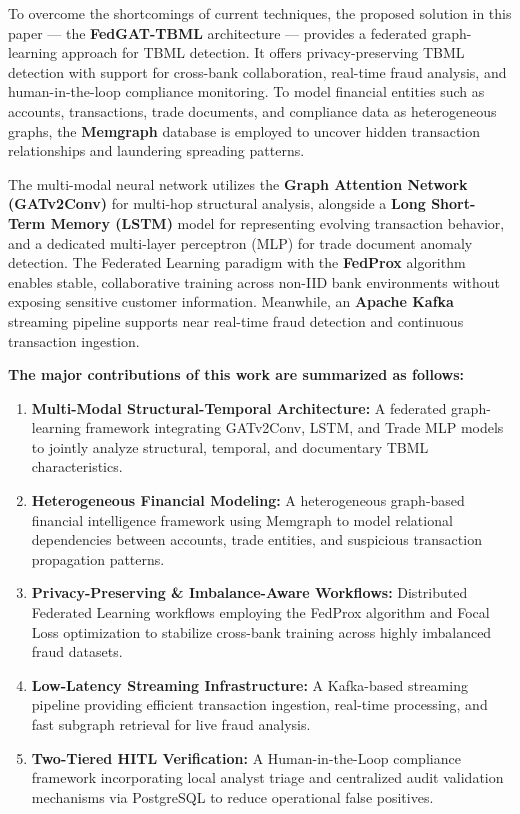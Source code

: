 \documentclass[conference]{IEEEtran}
\begin{document}
To overcome the shortcomings of current techniques, the proposed solution in this paper --- the \textbf{FedGAT-TBML} architecture --- provides a federated graph-learning approach for TBML detection. It offers privacy-preserving TBML detection with support for cross-bank collaboration, real-time fraud analysis, and human-in-the-loop compliance monitoring. To model financial entities such as accounts, transactions, trade documents, and compliance data as heterogeneous graphs, the \textbf{Memgraph} database is employed to uncover hidden transaction relationships and laundering spreading patterns.

The multi-modal neural network utilizes the \textbf{Graph Attention Network (GATv2Conv)} for multi-hop structural analysis, alongside a \textbf{Long Short-Term Memory (LSTM)} model for representing evolving transaction behavior, and a dedicated multi-layer perceptron (MLP) for trade document anomaly detection. The Federated Learning paradigm with the \textbf{FedProx} algorithm enables stable, collaborative training across non-IID bank environments without exposing sensitive customer information. Meanwhile, an \textbf{Apache Kafka} streaming pipeline supports near real-time fraud detection and continuous transaction ingestion.

\textbf{The major contributions of this work are summarized as follows:}

\begin{enumerate}

\item \textbf{Multi-Modal Structural-Temporal Architecture:}
A federated graph-learning framework integrating GATv2Conv, LSTM, and Trade MLP models to jointly analyze structural, temporal, and documentary TBML characteristics.

\item \textbf{Heterogeneous Financial Modeling:}
A heterogeneous graph-based financial intelligence framework using Memgraph to model relational dependencies between accounts, trade entities, and suspicious transaction propagation patterns.

\item \textbf{Privacy-Preserving \& Imbalance-Aware Workflows:}
Distributed Federated Learning workflows employing the FedProx algorithm and Focal Loss optimization to stabilize cross-bank training across highly imbalanced fraud datasets.

\item \textbf{Low-Latency Streaming Infrastructure:}
A Kafka-based streaming pipeline providing efficient transaction ingestion, real-time processing, and fast subgraph retrieval for live fraud analysis.

\item \textbf{Two-Tiered HITL Verification:}
A Human-in-the-Loop compliance framework incorporating local analyst triage and centralized audit validation mechanisms via PostgreSQL to reduce operational false positives.

\end{enumerate}
\end{document}
